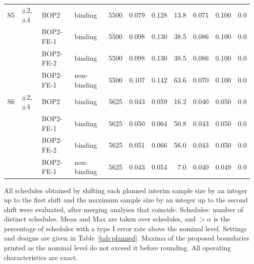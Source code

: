 \begin{table}
\begin{tabular}{llllrrrrrrr}
\midrule
S5 & $\pm 2$, $\pm 4$ & BOP2 & binding & 5500 & 0.079 & 0.128 & 13.8 & 0.071 & 0.100 & 0.0 \\
 &  & BOP2-FE-1 & binding & 5500 & 0.098 & 0.130 & 38.5 & 0.086 & 0.100 & 0.0 \\
 &  & BOP2-FE-2 & binding & 5500 & 0.098 & 0.130 & 38.5 & 0.086 & 0.100 & 0.0 \\
 &  & BOP2-FE-1 & non-binding & 5500 & 0.107 & 0.142 & 63.6 & 0.070 & 0.100 & 0.0 \\
\midrule
S6 & $\pm 2$, $\pm 4$ & BOP2 & binding & 5625 & 0.043 & 0.059 & 16.2 & 0.040 & 0.050 & 0.0 \\
 &  & BOP2-FE-1 & binding & 5625 & 0.050 & 0.064 & 50.8 & 0.043 & 0.050 & 0.0 \\
 &  & BOP2-FE-2 & binding & 5625 & 0.051 & 0.066 & 56.0 & 0.043 & 0.050 & 0.0 \\
 &  & BOP2-FE-1 & non-binding & 5625 & 0.043 & 0.054 & 7.0 & 0.040 & 0.049 & 0.0 \\
\bottomrule
\end{tabular}
\par\medskip
\begin{minipage}{0.95\textwidth}
\footnotesize
All schedules obtained by shifting each planned interim sample size by an integer up to the first shift and the maximum sample size by an integer up to the second shift were evaluated, after merging analyses that coincide. Schedules: number of distinct schedules. Mean and Max are taken over schedules, and $>\alpha$ is the percentage of schedules with a type I error rate above the nominal level. Settings and designs are given in Table~\ref{tab:planned}. Maxima of the proposed boundaries printed as the nominal level do not exceed it before rounding. All operating characteristics are exact.
\end{minipage}
\end{table}
